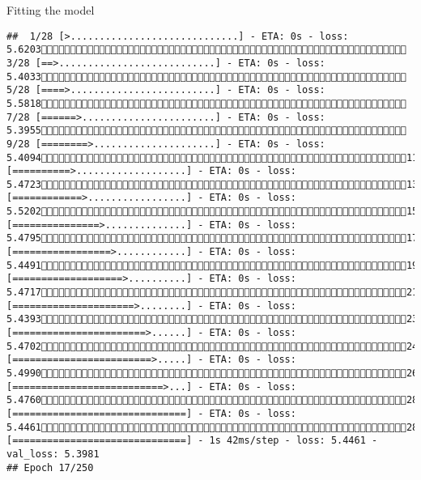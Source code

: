 \documentclass[
  ignorenonframetext,
]{beamer}
\begin{document}
\begin{frame}[fragile]{Fitting the model}
\begin{verbatim}
##  1/28 [>.............................] - ETA: 0s - loss: 5.6203 3/28 [==>...........................] - ETA: 0s - loss: 5.4033 5/28 [====>.........................] - ETA: 0s - loss: 5.5818 7/28 [======>.......................] - ETA: 0s - loss: 5.3955 9/28 [========>.....................] - ETA: 0s - loss: 5.409411/28 [==========>...................] - ETA: 0s - loss: 5.472313/28 [============>.................] - ETA: 0s - loss: 5.520215/28 [===============>..............] - ETA: 0s - loss: 5.479517/28 [=================>............] - ETA: 0s - loss: 5.449119/28 [===================>..........] - ETA: 0s - loss: 5.471721/28 [=====================>........] - ETA: 0s - loss: 5.439323/28 [=======================>......] - ETA: 0s - loss: 5.470224/28 [========================>.....] - ETA: 0s - loss: 5.499026/28 [==========================>...] - ETA: 0s - loss: 5.476028/28 [==============================] - ETA: 0s - loss: 5.446128/28 [==============================] - 1s 42ms/step - loss: 5.4461 - val_loss: 5.3981
## Epoch 17/250

\end{verbatim}
\end{frame}
\end{document}
